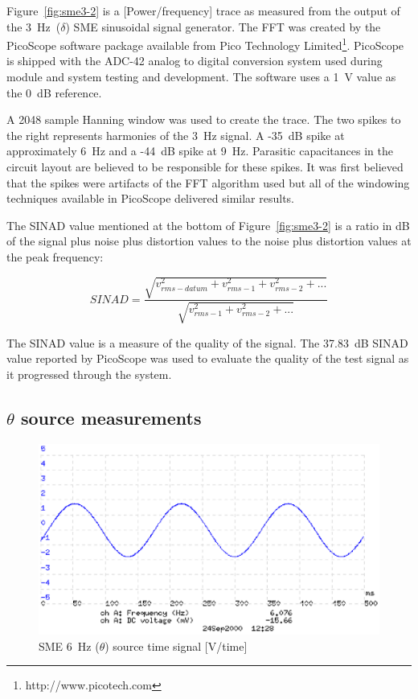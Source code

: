 Figure~\ref{fig:sme3-2} is a [Power/frequency] trace as measured from
the output of the 3~Hz~($\delta$) SME sinusoidal signal generator. The
FFT was created by the PicoScope software package available from Pico
Technology Limited\footnote{http://www.picotech.com}. PicoScope is
shipped with the ADC-42 analog to digital conversion system used
during module and system testing and development. The software uses a
1~V value as the 0~dB reference.

A 2048 sample Hanning window was used to create the trace. The two
spikes to the right represents harmonies of the 3~Hz signal. A -35~dB
spike at approximately 6~Hz and a -44~dB spike at 9~Hz. Parasitic
capacitances in the circuit layout are believed to be responsible for
these spikes. It was first believed that the spikes were artifacts of
the FFT algorithm used but all of the windowing techniques available
in PicoScope delivered similar results.

The SINAD value mentioned at the bottom of Figure~\ref{fig:sme3-2} is
a ratio in dB of the signal plus noise plus distortion values to the
noise plus distortion values at the peak frequency:


\begin{equation} 
	SINAD = \frac{\sqrt{v_{rms-datum}^2 + v_{rms-1}^2 + v_{rms-2}^2 +
	...}}{\sqrt{v_{rms-1}^2 + v_{rms-2}^2 + ...}}
\label{eq:SINAD}
\end{equation}

The SINAD value is a measure of the quality of the signal. The
37.83~dB SINAD value reported by PicoScope was used to evaluate the
quality of the test signal as it progressed through the system.

\subsection{$\theta$ source measurements}

\begin{figure}[htbp]
\begin{center}
	\includegraphics[width=\textwidth]{SME62.ps}
    \caption{SME 6~Hz ($\theta$) source time signal [V/time]}
    \label{fig:sme6-2}
\end{center}
\end{figure}

